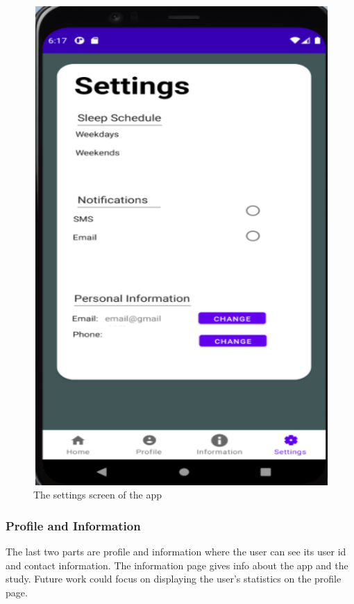 \documentclass{article}
\begin{document}
\begin{figure}[!h]
  \begin{center}
    \includegraphics[scale=0.8]{Android2.png}
    \caption{The settings screen of the app
}
    \label{fig:android2}
  \end{center}
\end{figure}

\subsubsection{Profile and Information}
The last two parts are profile and information where the user can see its user id and contact information. The information page gives info about the app and the study. Future work could focus on displaying the user’s statistics on the profile page. 
\end{document}
